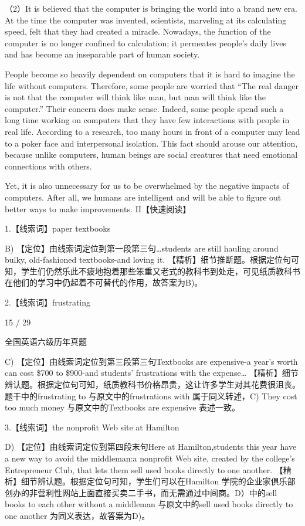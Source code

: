\documentclass[UTF8,11pt]{ctexart}
\begin{document}
（2）It is believed that the computer is bringing the world into a brand new era. At the time the computer was invented, scientists, marveling at its calculating speed, felt that they had created a miracle. Nowadays, the function of the computer is no longer confined to calculation; it permeates people’s daily lives and has become an inseparable part of human society.


People become so heavily dependent on computers that it is hard to imagine the life without computers. Therefore, some people are worried that “The real danger is not that the computer will think like man, but man will think like the computer.” Their concern does make sense. Indeed, some people spend such a long time working on computers that they have few interactions with people in real life. According to a research, too many hours in front of a computer may lead to a poker face and interpersonal isolation. This fact should arouse our attention, because unlike computers, human beings are social creatures that need emotional connections with others.


Yet, it is also unnecessary for us to be overwhelmed by the negative impacts of computers. After all, we humans are intelligent and will be able to figure out better ways to make improvements. II【快速阅读】


1.【线索词】paper textbooks


B) 【定位】由线索词定位到第一段第三句…students are still hauling around bulky, old-fashioned textbooks-and loving it. 【精析】细节推断题。根据定位句可知，学生们仍然乐此不疲地抱着那些笨重又老式的教科书到处走，可见纸质教科书在他们的学习中仍起着不可替代的作用，故答案为B)。


2.【线索词】frustrating


15 / 29


全国英语六级历年真题


C) 【定位】由线索词定位到第三段第三句Textbooks are expensive-a year's worth can cost \$700 to \$900-and students' frustrations with the expense… 【精析】细节辨认题。根据定位句可知，纸质教科书价格昂贵，这让许多学生对其花费很沮丧。题干中的frustrating to 与原文中的frustrations with 属于同义转述，C) They cost too much money 与原文中的Textbooks are expensive 表述一致。


3.【线索词】the nonprofit Web site at Hamilton


D) 【定位】由线索词定位到第四段末句Here at Hamilton,students this year have a new way to avoid the middleman:a nonprofit Web site, created by the college's Entrepreneur Club, that lets them sell used books directly to one another. 【精析】细节辨认题。根据定位句可知，学生们可以在Hamilton 学院的企业家俱乐部创办的非营利性网站上面直接买卖二手书，而无需通过中间商。D）中的sell books to each other without a middleman 与原文中的sell used books directly to one another 为同义表达，故答案为D)。
\end{document}
